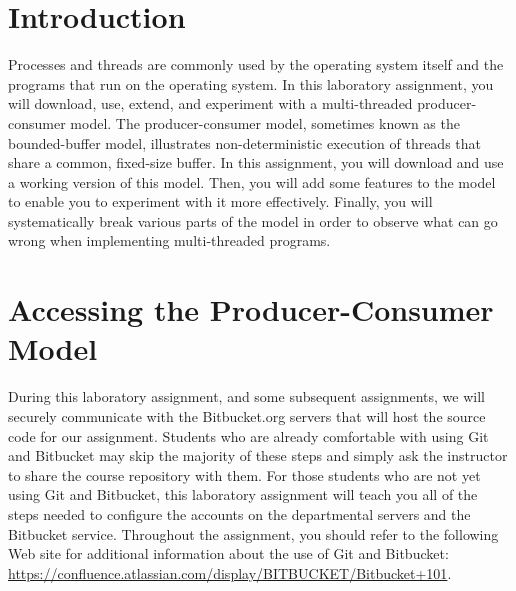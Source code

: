 

\usepackage[compact]{titlesec}



\section*{Introduction}

Processes and threads are commonly used by the operating system itself and the programs that run on the operating system.  In this
laboratory assignment, you will download, use, extend, and experiment with a multi-threaded producer-consumer model.  The
producer-consumer model, sometimes known as the bounded-buffer model, illustrates non-deterministic execution of threads that
share a common, fixed-size buffer.  In this assignment, you will download and use a working version of this model.  Then, you will
add some features to the model to enable you to experiment with it more effectively.  Finally, you will systematically break
various parts of the model in order to observe what can go wrong when implementing multi-threaded programs.

\section*{Accessing the Producer-Consumer Model}

During this laboratory assignment, and some subsequent assignments, we will securely communicate with the Bitbucket.org servers
that will host the source code for our assignment. Students who are already comfortable with using Git and Bitbucket may skip the
majority of these steps and simply ask the instructor to share the course repository with them.  For those students who are not
yet using Git and Bitbucket, this laboratory assignment will teach you all of the steps needed to configure the accounts on the
departmental servers and the Bitbucket service.  Throughout the assignment, you should refer to the following Web site for
additional information about the use of Git and Bitbucket: \url{https://confluence.atlassian.com/display/BITBUCKET/Bitbucket+101}.  


